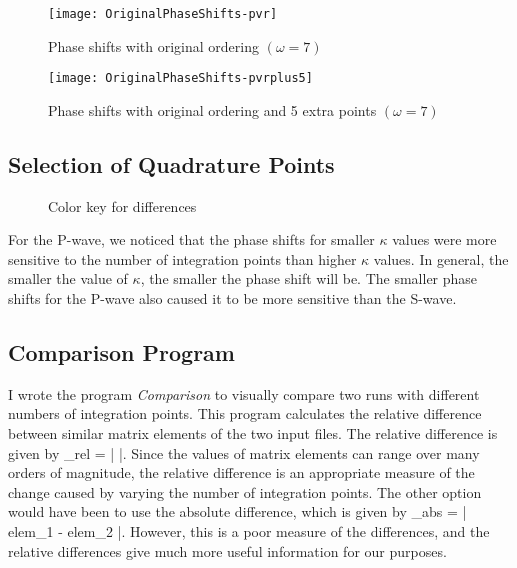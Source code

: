 \documentclass[Dissertation.tex]{subfiles}
\begin{document}
\begin{figure}[H]
	\centering
	\texttt{[image: OriginalPhaseShifts-pvr]}
	\caption{Phase shifts with original ordering $(\omega = 7)$}
	\label{fig:OriginalPhaseShifts-pvr}
\end{figure}

\begin{figure}[H]
	\centering
	\texttt{[image: OriginalPhaseShifts-pvrplus5]}
	\caption{Phase shifts with original ordering and 5 extra points $(\omega = 7)$}
	\label{fig:OriginalPhaseShifts-pvrplus5}
\end{figure}



\subsection{Selection of Quadrature Points}
\label{sec:SelQuadPoints2}

\begin{figure}[H]
	\caption{Color key for differences}
	\label{fig:ColorKey}
\end{figure}

For the P-wave, we noticed that the phase shifts for smaller $\kappa$ values were more sensitive to the number of integration points than higher $\kappa$ values. In general, the smaller the value of $\kappa$, the smaller the phase shift will be. The smaller phase shifts for the P-wave also caused it to be more sensitive than the S-wave.

\subsection{Comparison Program}
I wrote the program \emph{Comparison} \cite{} to visually compare two runs with different numbers of integration points. This program calculates the relative difference between similar matrix elements of the two input files. The relative difference is given by
\beq
{}_{rel} = \left|  \right|.
\eeq
Since the values of matrix elements can range over many orders of magnitude, the relative difference is an appropriate measure of the change caused by varying the number of integration points. The other option would have been to use the absolute difference, which is given by 
\beq
{}_{abs} = \left| elem_1 - elem_2 \right|.
\eeq
However, this is a poor measure of the differences, and the relative differences give much more useful information for our purposes.
\end{document}
